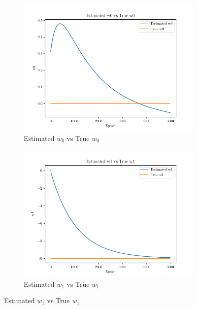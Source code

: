 \documentclass[a4paper]{article}
\begin{document}
\begin{enumerate}
	      \begin{figure}[H]
		      \centering
		      \begin{subfigure}{0.4\textwidth}
			      \centering
			      \includegraphics[width=\linewidth]{../Graph/Estimated-True-w0.png}
			      \caption{Estimated $w_0$ vs True $w_0$}
			      \label{fig:question8a}
		      \end{subfigure}
		      \hfill
		      \begin{subfigure}{0.4\textwidth}
			      \centering
			      \includegraphics[width=\linewidth]{../Graph/Estimated-True-w1.png}
			      \caption{Estimated $w_1$ vs True $w_1$}
			      \label{fig:question8b}
		      \end{subfigure}


\end{figure}
\end{enumerate}
\end{document}
